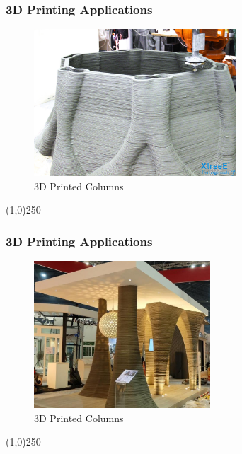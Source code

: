 \begin{frame}
\frametitle{3D Printing Applications}
\begin{figure}[h]
	\centering
	\includegraphics[height=5.5cm]{img/3DPrinting/3dprintedColumn.jpg}
	\caption[3D Printed Columns]{3D Printed Columns}
	\label{fig:3dprintcolumn}
\end{figure}
\end{frame}
\begin{center}\line(1,0){250}\end{center}


\begin{frame}
\frametitle{3D Printing Applications}
\begin{figure}[h]
	\centering
	\includegraphics[height=5.5cm]{img/3DPrinting/3dprintColumn.jpg}
	\caption[3D Printed Columns]{3D Printed Columns}
	\label{fig:multiple3dprintcolumn}
\end{figure}
\end{frame}
\begin{center}\line(1,0){250}\end{center}




